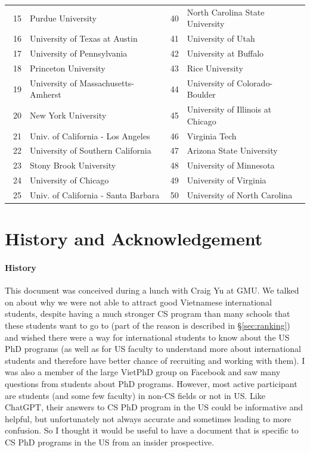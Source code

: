 \documentclass[11pt]{article}
\newcommand{\red}[1]{{\color{red}{#1}}}
\begin{document}
\begin{table}
\begin{tabular}{rl|rl}
    15 &   Purdue University  &40& North Carolina State University\\\  
    16 & University of Texas at Austin   &41 & University of Utah \\
    17 & University of Pennsylvania\red{$^*$} &42 & University at Buffalo\red{$^*$}\\
    18 & Princeton University  & 43& Rice University\\
    19 & University of Massachusetts-Amherst\red{$^*$} & 44&  University of Colorado-Boulder \\
    20 &  New York University  &45& University of Illinois at Chicago  \\
    21 & Univ. of California - Los Angeles &46& Virginia Tech\red{$^*$}  \\
    22 & University of Southern California &47&  Arizona State University\red{$^*$} \\
    23 & Stony Brook University\red{$^*$} &48&University of Minnesota \\
    24 & University of Chicago &49& University of Virginia \\
    25 & Univ. of California - Santa Barbara &50& University of North Carolina\red{$^*$} \\
    \bottomrule
    \end{tabular}
\end{table}

\section{History and Acknowledgement}

\paragraph{History} This document was conceived during a lunch with Craig Yu at GMU.  We talked on about why we were not able to attract good Vietnamese international students, despite having a much stronger CS program than many schools that these students want to go to (part of the reason is described in \S\ref{sec:ranking}) and wished there were a way for international students to know about the US PhD programs (as well as for US faculty to understand more about international students and therefore have better chance of recruiting and working with them). I was also  a member of the large VietPhD group on Facebook and saw many questions from students about PhD programs.  However, most active participant are students (and some few faculty) in non-CS fields or not in US. Like ChatGPT, their answers to CS PhD program in the US could be informative and helpful, but unfortunately not always accurate and sometimes leading to more confusion. So I thought it would be useful to have a document that is specific to CS PhD programs in the US from an insider prospective.  
\end{document}
